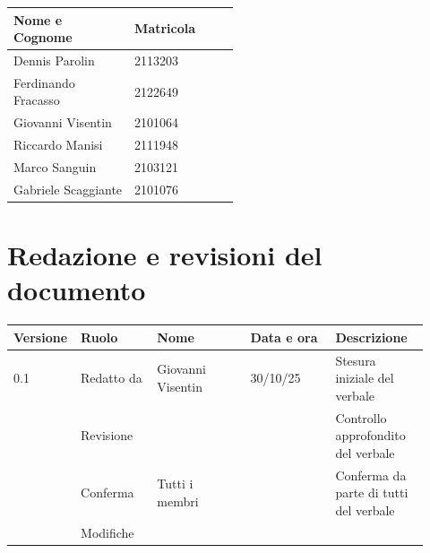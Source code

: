 \documentclass[a4paper,12pt]{article}
\begin{document}
\begin{center}
\small
\renewcommand{\arraystretch}{1.2}
\begin{tabular}{|p{0.3\linewidth}|p{0.2\linewidth}|}
\hline
\rowcolor{gray!60}
\textbf{Nome e Cognome} & \textbf{Matricola} \\
\hline
Dennis Parolin & 2113203 \\
\hline
Ferdinando Fracasso & 2122649 \\
\hline
Giovanni Visentin & 2101064 \\
\hline
Riccardo Manisi & 2111948 \\
\hline
Marco Sanguin & 2103121 \\
\hline
Gabriele Scaggiante & 2101076 \\
\hline
\end{tabular}
\end{center}

\clearpage
\section{Redazione e revisioni del documento}

\begin{center}
\small
\renewcommand{\arraystretch}{1.2} 
\begin{tabular}{|p{0.1\linewidth}|p{0.18\linewidth}|p{0.22\linewidth}|p{0.20\linewidth}|p{0.22\linewidth}|}
\hline
\rowcolor{gray!60} 
\textbf{Versione} & \textbf{Ruolo} & \textbf{Nome} & \textbf{Data e ora} & \textbf{Descrizione} \\
\hline
\rowcolor{white}
0.1 & Redatto da & Giovanni Visentin & 30/10/25 & Stesura iniziale del verbale \\
\hline
\rowcolor{gray!20}
 & Revisione &  &  & Controllo approfondito del verbale \\
\hline
\rowcolor{white}
 & Conferma & Tutti i membri &  & Conferma da parte di tutti del verbale \\
\hline
\rowcolor{gray!20}
 & Modifiche &  &  &  \\
\hline
\end{tabular}
\end{center}
\end{document}
